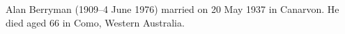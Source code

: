 
Alan Berryman (1909--4 June 1976) married  on 20 May 1937 in Canarvon.\cite{ConnieWedding}
He died aged 66 in Como, Western Australia.\cite{KC00051342}
